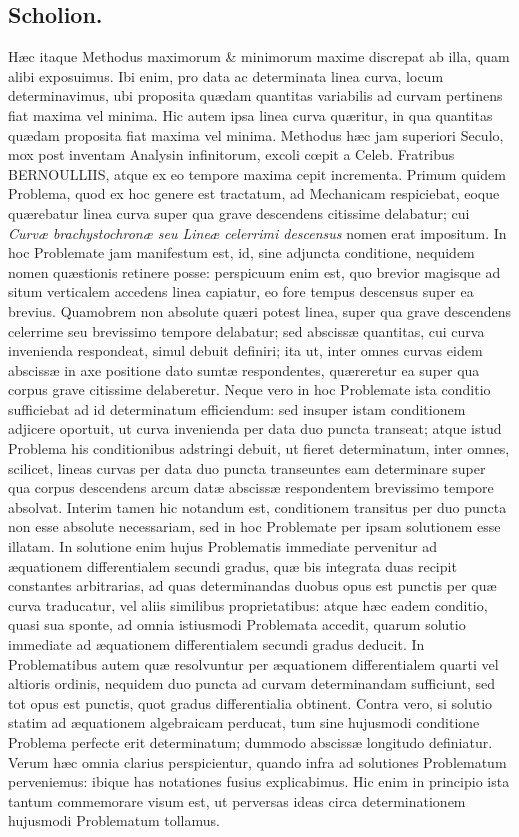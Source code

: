 \subsection*{Scholion.}
Hæc itaque Methodus maximorum \& minimorum maxime discrepat ab illa, quam alibi exposuimus. Ibi enim, pro data ac determinata linea curva, locum determinavimus, ubi proposita quædam quantitas variabilis ad curvam pertinens fiat maxima vel minima. Hic autem ipsa linea curva quæritur, in qua quantitas quædam proposita fiat maxima vel minima. Methodus hæc jam superiori Seculo, mox post inventam Analysin infinitorum, excoli cœpit a Celeb. Fratribus BERNOULLIIS, atque ex eo tempore maxima cepit incrementa. Primum quidem Problema, quod ex hoc genere est tractatum, ad Mechanicam respiciebat, eoque quærebatur linea curva super qua grave descendens citissime delabatur; cui \textit{Curvæ brachystochronæ seu Lineæ celerrimi descensus} nomen erat impositum. In hoc Problemate
jam manifestum est, id, sine adjuncta conditione, nequidem nomen quæstionis retinere posse: perspicuum enim est, quo brevior magisque ad situm verticalem accedens linea capiatur, eo fore tempus descensus super ea brevius. Quamobrem non absolute quæri potest linea, super qua grave descendens celerrime seu brevissimo tempore delabatur; sed abscissæ quantitas, cui curva invenienda respondeat, simul debuit definiri; ita ut, inter omnes curvas eidem abscissæ in axe positione dato sumtæ respondentes, quæreretur ea super qua corpus grave citissime delaberetur. Neque vero in hoc Problemate ista conditio sufficiebat ad id determinatum efficiendum: sed insuper istam conditionem adjicere oportuit, ut curva invenienda per data duo puncta transeat; atque istud Problema his conditionibus adstringi debuit, ut fieret determinatum, inter omnes, scilicet, lineas curvas per data duo puncta transeuntes eam determinare super qua corpus descendens arcum datæ abscissæ respondentem brevissimo tempore absolvat. Interim tamen hic notandum est, conditionem transitus per duo puncta non esse absolute necessariam, sed in hoc Problemate per ipsam solutionem esse illatam. In solutione enim hujus Problematis immediate pervenitur ad æquationem differentialem secundi gradus, quæ bis integrata duas recipit constantes arbitrarias, ad quas determinandas duobus opus est punctis per quæ curva traducatur, vel aliis similibus proprietatibus: atque hæc eadem conditio, quasi sua sponte, ad omnia istiusmodi Problemata accedit, quarum solutio immediate ad æquationem differentialem secundi gradus deducit. In Problematibus autem quæ resolvuntur per æquationem differentialem quarti vel altioris ordinis, nequidem duo puncta ad curvam determinandam sufficiunt, sed tot opus est punctis, quot gradus differentialia obtinent. Contra vero, si solutio statim ad æquationem algebraicam perducat, tum sine hujusmodi conditione Problema perfecte erit determinatum; dummodo abscissæ longitudo definiatur. Verum hæc omnia clarius perspicientur, quando infra ad solutiones Problematum perveniemus: ibique has notationes fusius explicabimus. Hic enim in principio ista tantum commemorare visum est, ut
perversas ideas circa determinationem hujusmodi Problematum tollamus.

